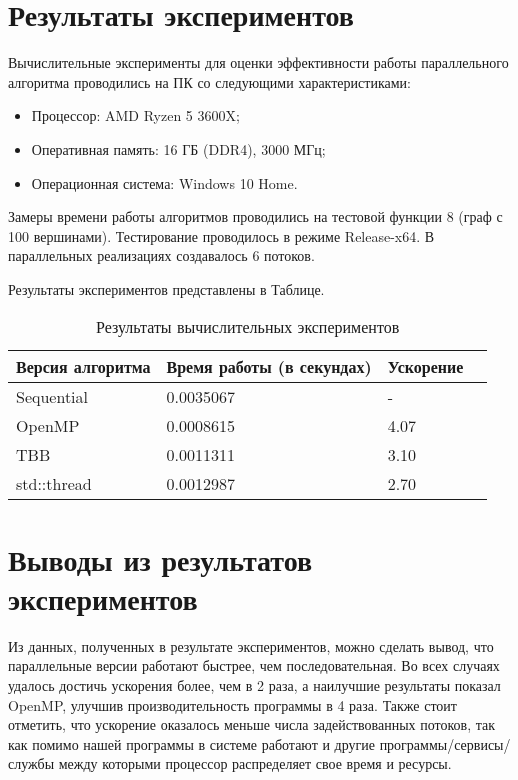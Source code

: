 \documentclass{report}
\begin{document}
\section*{Результаты экспериментов}
Вычислительные эксперименты для оценки эффективности работы параллельного алгоритма проводились на ПК со следующими характеристиками:
\begin{itemize}
\item Процессор: AMD Ryzen 5 3600X;
\item Оперативная память: 16 ГБ (DDR4), 3000 МГц;
\item Операционная система: Windows 10 Home.
\end{itemize}
\par Замеры времени работы алгоритмов проводились на тестовой функции 8 (граф с 100 вершинами). Тестирование проводилось в режиме Release-x64. В параллельных реализациях создавалось 6 потоков.

\par Результаты экспериментов представлены в Таблице.
\begin{table}[!h]
\caption{Результаты вычислительных экспериментов}
\centering
\begin{tabular}{| p{2cm} | p{3cm} | p{4cm} | p{2cm} |}
\hline
Версия алгоритма & Время работы (в секундах) & Ускорение  \\[5pt]
\hline
Sequential        & 0.0035067        & -         \\
OpenMP        & 0.0008615        & 4.07         \\
TBB       & 0.0011311        & 3.10      \\
std::thread        & 0.0012987        & 2.70           \\

\hline
\end{tabular}
\end{table}

\newpage

\section*{Выводы из результатов экспериментов}
Из данных, полученных в результате экспериментов, можно сделать вывод, что параллельные версии работают быстрее, чем последовательная. Во всех случаях удалось достичь ускорения более, чем в 2 раза, а наилучшие результаты показал OpenMP, улучшив производительность программы в 4 раза. Также стоит отметить, что ускорение оказалось меньше числа задействованных потоков, так как помимо нашей программы в системе работают и другие программы/сервисы/службы между которыми процессор распределяет свое время и ресурсы. 
\newpage
\end{document}

